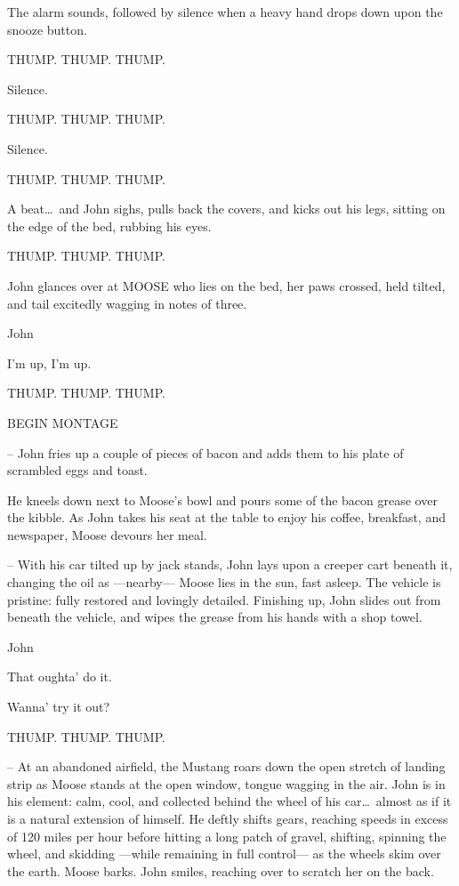 \documentclass[letterpaper,literary]{screenwriter}
\begin{document}
The alarm sounds, followed by silence when a heavy hand drops down upon
the snooze button.

THUMP.  THUMP.  THUMP.

Silence.

THUMP.  THUMP.  THUMP.

Silence.

THUMP.  THUMP.  THUMP.

A beat\dots\ and John sighs, pulls back the covers, and kicks out his
legs, sitting on the edge of the bed, rubbing his eyes.

THUMP.  THUMP.  THUMP.

John glances over at MOOSE who lies on the bed, her paws crossed, held
tilted, and tail excitedly wagging in notes of three.

\begin{dialogue}[growls]{John}

    I'm up, I'm up.

\end{dialogue}

THUMP.  THUMP.  THUMP.

BEGIN MONTAGE

-- John fries up a couple of pieces of bacon and adds them to his plate
of scrambled eggs and toast.

He kneels down next to Moose's bowl and pours some of the bacon grease
over the kibble.  As John takes his seat at the table to enjoy his
coffee, breakfast, and newspaper, Moose devours her meal.

-- With his car tilted up by jack stands, John lays upon a creeper cart
beneath it, changing the oil as ---nearby--- Moose lies in the sun, fast
asleep.  The vehicle is pristine: fully restored and lovingly detailed.
Finishing up, John slides out from beneath the vehicle, and wipes the
grease from his hands with a shop towel.

\begin{dialogue}{John \contd}

    That oughta' do it.


    Wanna' try it out?

\end{dialogue}

THUMP.  THUMP.  THUMP.

-- At an abandoned airfield, the Mustang roars down the open stretch of
landing strip as Moose stands at the open window, tongue wagging in the
air.  John is in his element: calm, cool, and collected behind the wheel
of his car\dots\ almost as if it is a natural extension of himself.  He
deftly shifts gears, reaching speeds in excess of 120 miles per hour
before hitting a long patch of gravel, shifting, spinning the wheel, and
skidding ---while remaining in full control--- as the wheels skim over
the earth.  Moose barks.  John smiles, reaching over to scratch her on
the back.
\end{document}

